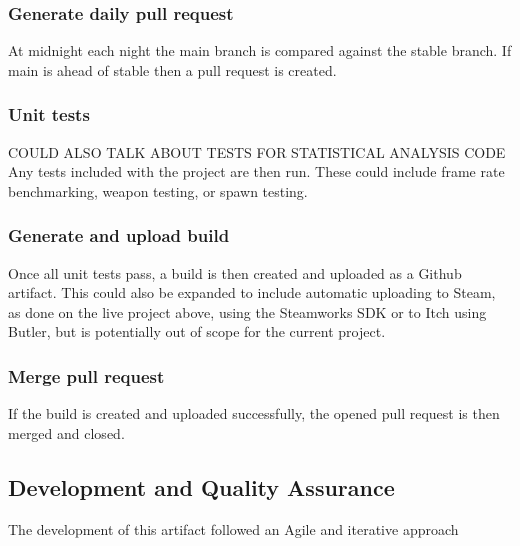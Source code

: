 \documentclass[journal]{IEEEtran}
\begin{document}
\subsubsection*{Generate daily pull request}
At midnight each night the main branch is compared against the stable branch. If main is ahead of stable then a pull request is created.\\

\subsubsection*{Unit tests}
COULD ALSO TALK ABOUT TESTS FOR STATISTICAL ANALYSIS CODE
Any tests included with the project are then run. These could include frame rate benchmarking, weapon testing, or spawn testing.\\

\subsubsection*{Generate and upload build}
Once all unit tests pass, a build is then created and uploaded as a Github artifact\cite{gitartifacts}. This could also be expanded to include automatic uploading to Steam, as done on the live project above, using the Steamworks SDK\cite{steamupload} or to Itch using Butler\cite{itchupload}, but is potentially out of scope for the current project.\\

\subsubsection*{Merge pull request}
If the build is created and uploaded successfully, the opened pull request is then merged and closed.\\




\subsection{Development and Quality Assurance}
The development of this artifact followed an Agile \cite{agilemanifesto} and iterative approach

\end{document}

